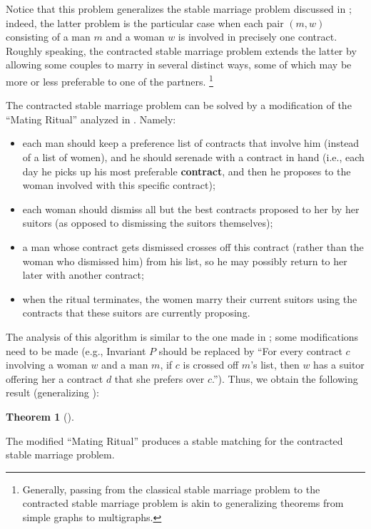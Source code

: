 \documentclass[numbers=enddot,12pt,final,onecolumn,notitlepage]{scrartcl}%
\theoremstyle{definition}
\newtheorem{theo}{Theorem}[section]
\newenvironment{theorem}[1][]
{\begin{theo}[#1]\begin{leftbar}}
{\end{leftbar}\end{theo}}
\newcommand{\tup}[1]{\left( #1 \right)}
\begin{document}
Notice that this problem generalizes the stable marriage
problem discussed in \cite[Section 6.4]{LeLeMe16}; indeed, the
latter problem is the particular case when each pair $\tup{m, w}$
consisting of a man $m$ and a woman $w$ is involved in precisely
one contract.
Roughly speaking, the contracted stable marriage problem
extends the latter by allowing some couples to marry in
several distinct ways, some of which may be more or less
preferable to one of the partners.
\footnote{Generally, passing from the classical stable marriage
problem to the contracted stable marriage problem is akin
to generalizing theorems from simple graphs to multigraphs.}

The contracted stable marriage problem can be solved by a
modification of the ``Mating Ritual'' analyzed in
\cite[Section 6.4]{LeLeMe16}.
Namely:
\begin{itemize}
 \item each man should keep a preference list of contracts that
       involve him (instead of a list of women),
       and he should serenade with a contract in hand (i.e.,
       each day he picks up his most preferable
       \textbf{contract}, and then he proposes to the woman
       involved with this specific contract);
 \item each woman should dismiss all but the best contracts
       proposed to her by her suitors (as opposed to dismissing
       the suitors themselves);
 \item a man whose contract gets dismissed crosses off this
       contract (rather than the woman who dismissed him) from
       his list,
       so he may possibly return to her later with another
       contract;
 \item when the ritual terminates, the women marry their
       current suitors using the contracts that these suitors
       are currently proposing.
\end{itemize}

The analysis of this algorithm is similar to the one made in
\cite[Section 6.4.2 and Section 6.4.3]{LeLeMe16}; some
modifications need to be made (e.g., Invariant $P$ should
be replaced by
``For every contract $c$ involving a woman $w$ and a man $m$,
if $c$ is crossed off $m$'s list, then $w$ has a suitor
offering her a contract $d$ that she prefers over $c$.'').
Thus, we obtain the following result
(generalizing \cite[Theorem 6.4.4]{LeLeMe16}):

\begin{theorem} \label{thm.stable-matching.contracted.MR.correct}
The modified ``Mating Ritual'' produces a stable matching
for the contracted stable marriage problem.
\end{theorem}
\end{document}
